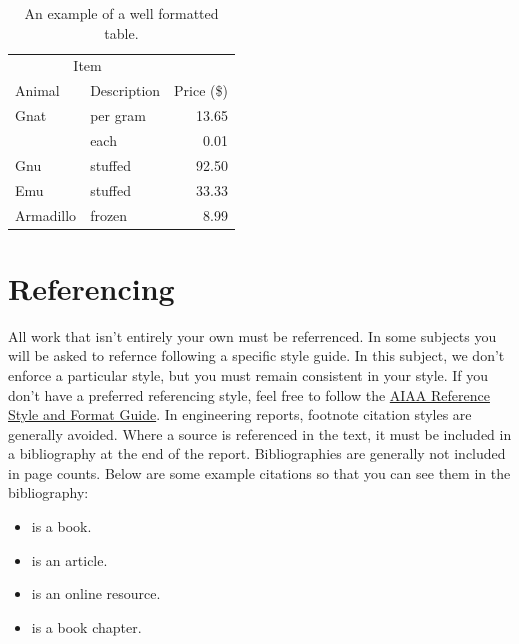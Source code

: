 \documentclass[draft,article]{UsydReport}
\begin{document}
\begin{table}
    \centering
    \caption{An example of a well formatted table.}
    \label{tab:Table}
    \begin{tabular}{@{}llr@{}} \toprule
    \multicolumn{2}{c}{Item} \\ \cmidrule(r){1-2}
    Animal & Description & Price (\$)\\ \midrule
    Gnat & per gram & 13.65 \\
    & each & 0.01 \\
    Gnu & stuffed & 92.50 \\
    Emu & stuffed & 33.33 \\
    Armadillo & frozen & 8.99 \\ \bottomrule
    \end{tabular}
\end{table}

\section{Referencing}
All work that isn't entirely your own must be referrenced. In some subjects you will be asked to refernce following a specific style guide. In this subject, we don't enforce a particular style, but you must remain consistent in your style. If you don't have a preferred referencing style, feel free to follow the \href{https://www.aiaa.org/publications/journals/reference-style-and-format}{AIAA Reference Style and Format Guide}. In engineering reports, footnote citation styles are generally avoided. Where a source is referenced in the text, it must be included in a bibliography at the end of the report. Bibliographies are generally not included in page counts. Below are some example citations so that you can see them in the bibliography:
\begin{itemize}
    \item \cite{dirac} is a book.
    \item \cite{einstein} is an article.
    \item \cite{knuthwebsite} is an online resource.
    \item \cite{knuth-fa} is a book chapter.
\end{itemize}

\clearpage
\backmatter{}
\printbibliography[heading=bibintoc]

\end{document}

